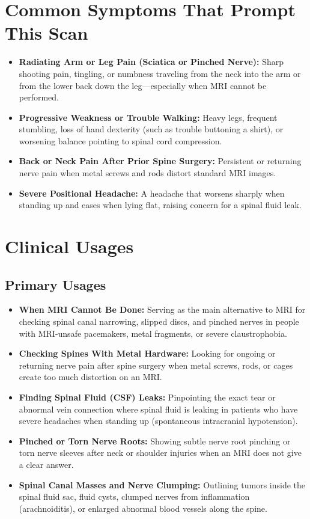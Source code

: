 \section{Common Symptoms That Prompt This Scan}
\begin{itemize}
    \item \textbf{Radiating Arm or Leg Pain (Sciatica or Pinched Nerve):} Sharp shooting pain, tingling, or numbness traveling from the neck into the arm or from the lower back down the leg---especially when MRI cannot be performed.
    \item \textbf{Progressive Weakness or Trouble Walking:} Heavy legs, frequent stumbling, loss of hand dexterity (such as trouble buttoning a shirt), or worsening balance pointing to spinal cord compression.
    \item \textbf{Back or Neck Pain After Prior Spine Surgery:} Persistent or returning nerve pain when metal screws and rods distort standard MRI images.
    \item \textbf{Severe Positional Headache:} A headache that worsens sharply when standing up and eases when lying flat, raising concern for a spinal fluid leak.
\end{itemize}

\section{Clinical Usages}

\subsection{Primary Usages}
\begin{itemize}
    \item \textbf{When MRI Cannot Be Done:} Serving as the main alternative to MRI for checking spinal canal narrowing, slipped discs, and pinched nerves in people with MRI-unsafe pacemakers, metal fragments, or severe claustrophobia.
    \item \textbf{Checking Spines With Metal Hardware:} Looking for ongoing or returning nerve pain after spine surgery when metal screws, rods, or cages create too much distortion on an MRI.
    \item \textbf{Finding Spinal Fluid (CSF) Leaks:} Pinpointing the exact tear or abnormal vein connection where spinal fluid is leaking in patients who have severe headaches when standing up (spontaneous intracranial hypotension).
    \item \textbf{Pinched or Torn Nerve Roots:} Showing subtle nerve root pinching or torn nerve sleeves after neck or shoulder injuries when an MRI does not give a clear answer.
    \item \textbf{Spinal Canal Masses and Nerve Clumping:} Outlining tumors inside the spinal fluid sac, fluid cysts, clumped nerves from inflammation (arachnoiditis), or enlarged abnormal blood vessels along the spine.
\end{itemize}

